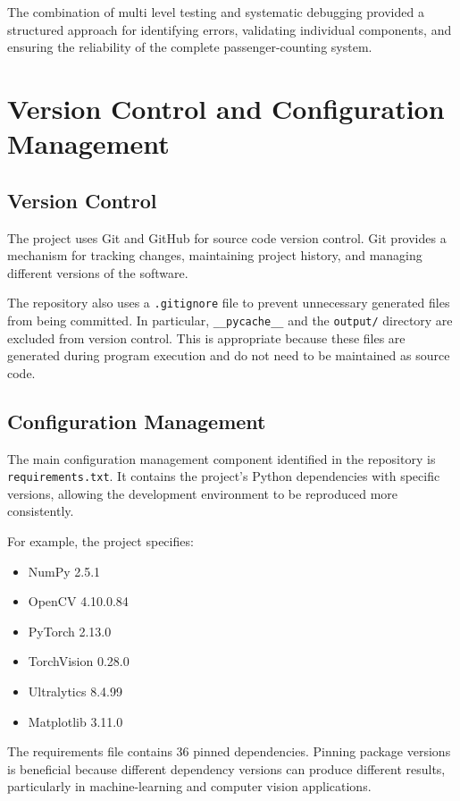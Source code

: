 The combination of multi level testing and systematic debugging provided a structured approach for identifying errors, validating individual components, and ensuring the reliability of the complete passenger-counting system.

\section{Version Control and Configuration Management}

\subsection{Version Control}

The project uses Git and GitHub for source code version control. Git provides a mechanism for tracking changes, maintaining project history, and managing different versions of the software.

The repository also uses a \texttt{.gitignore} file to prevent unnecessary generated files from being committed. In particular, \texttt{\_\_\allowbreak pycache\_\_} and the \texttt{output/} directory are excluded from version control. This is appropriate because these files are generated during program execution and do not need to be maintained as source code.

\subsection{Configuration Management}

The main configuration management component identified in the repository is
\texttt{requirements\allowbreak.txt}. It contains the project's Python dependencies
with specific versions, allowing the development environment to be reproduced more
consistently.

For example, the project specifies:

\begin{itemize}
    \item NumPy 2.5.1
    \item OpenCV 4.10.0.84
    \item PyTorch 2.13.0
    \item TorchVision 0.28.0
    \item Ultralytics 8.4.99
    \item Matplotlib 3.11.0
\end{itemize}

The requirements file contains 36 pinned dependencies. Pinning package versions is beneficial because different dependency versions can produce different results, particularly in machine-learning and computer vision applications.
